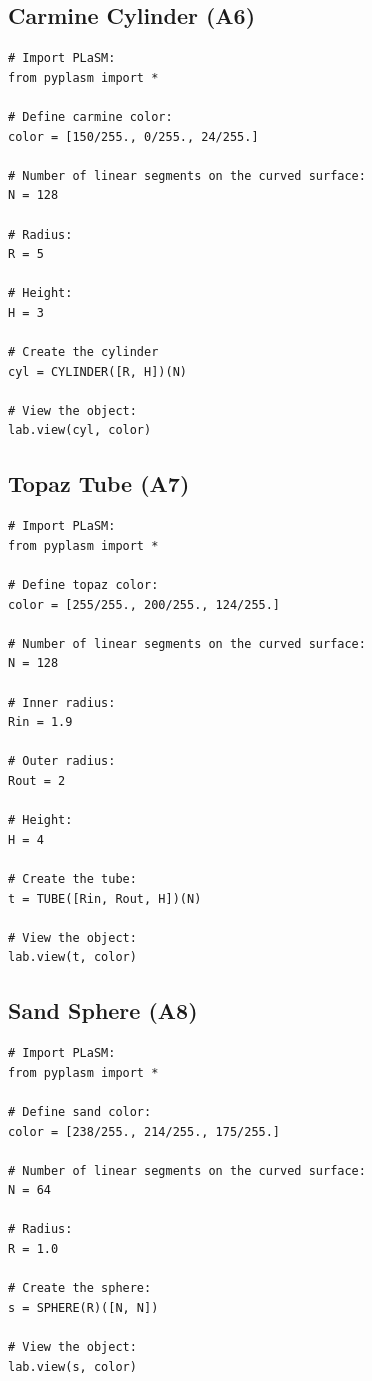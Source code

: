 \documentclass{article}
\begin{document}
\subsection{Carmine Cylinder (A6)}

\begin{verbatim}
# Import PLaSM:
from pyplasm import *

# Define carmine color:
color = [150/255., 0/255., 24/255.]

# Number of linear segments on the curved surface:
N = 128

# Radius:
R = 5

# Height:
H = 3

# Create the cylinder
cyl = CYLINDER([R, H])(N)

# View the object:
lab.view(cyl, color)
\end{verbatim}


\subsection{Topaz Tube (A7)}

\begin{verbatim}
# Import PLaSM:
from pyplasm import *

# Define topaz color:
color = [255/255., 200/255., 124/255.]

# Number of linear segments on the curved surface:
N = 128

# Inner radius:
Rin = 1.9

# Outer radius:
Rout = 2

# Height:
H = 4

# Create the tube:
t = TUBE([Rin, Rout, H])(N)

# View the object:
lab.view(t, color)
\end{verbatim}


\subsection{Sand Sphere (A8)}

\begin{verbatim}
# Import PLaSM:
from pyplasm import *

# Define sand color:
color = [238/255., 214/255., 175/255.]

# Number of linear segments on the curved surface:
N = 64

# Radius:
R = 1.0

# Create the sphere:
s = SPHERE(R)([N, N])

# View the object:
lab.view(s, color)
\end{verbatim}
\end{document}

